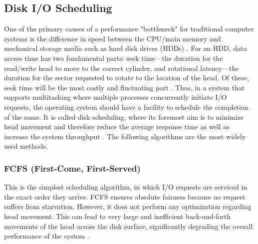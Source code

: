 \documentclass[12pt]{article}
\begin{document}

\subsection{Disk I/O Scheduling}

One of the primary causes of a performance "bottleneck" for traditional computer systems is the difference in speed between the CPU/main memory and mechanical storage media such as hard disk drives (HDDs) \parencite{Pokharel2021}. For an HDD, data access time has two fundamental parts: seek time—the duration for the read/write head to move to the correct cylinder, and rotational latency—the duration for the sector requested to rotate to the location of the head. Of these, seek time will be the most costly and fluctuating part \parencite{KansalDiskScheduling}. Thus, in a system that supports multitasking where multiple processes concurrently initiate I/O requests, the operating system should have a facility to schedule the completion of the same. It is called disk scheduling, where its foremost aim is to minimize head movement and therefore reduce the average response time as well as increase the system throughput \parencite{GeeksForGeeks2025IO}. The following algorithms are the most widely used methods.

\subsubsection{FCFS (First-Come, First-Served)}
This is the simplest scheduling algorithm, in which I/O requests are serviced in the exact order they arrive. FCFS ensures absolute fairness because no request suffers from starvation. However, it does not perform any optimization regarding head movement. This can lead to very large and inefficient back-and-forth movements of the head across the disk surface, significantly degrading the overall performance of the system \parencite{GeeksForGeeks2025IO}.
\end{document}
